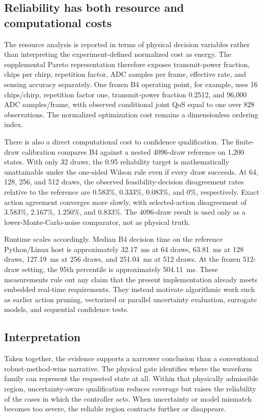 \subsection{Reliability has both resource and computational costs}

The resource analysis is reported in terms of physical decision variables rather than interpreting the experiment-defined normalized cost as energy. The supplemental Pareto representation therefore exposes transmit-power fraction, chips per chirp, repetition factor, ADC samples per frame, effective rate, and sensing accuracy separately. One frozen B4 operating point, for example, uses 16 chips/chirp, repetition factor one, transmit-power fraction 0.2512, and 96,000 ADC samples/frame, with observed conditional joint QoS equal to one over 828 observations. The normalized optimization cost remains a dimensionless ordering index.

There is also a direct computational cost to confidence qualification. The finite-draw calibration compares B4 against a nested 4096-draw reference on 1,200 states. With only 32 draws, the 0.95 reliability target is mathematically unattainable under the one-sided Wilson rule even if every draw succeeds. At 64, 128, 256, and 512 draws, the observed feasibility-decision disagreement rates relative to the reference are 0.583\%, 0.333\%, 0.083\%, and 0\%, respectively. Exact action agreement converges more slowly, with selected-action disagreement of 3.583\%, 2.167\%, 1.250\%, and 0.833\%. The 4096-draw result is used only as a lower-Monte-Carlo-noise comparator, not as physical truth.

Runtime scales accordingly. Median B4 decision time on the reference Python/Linux host is approximately 32.17~ms at 64 draws, 63.81~ms at 128 draws, 127.19~ms at 256 draws, and 251.04~ms at 512 draws. At the frozen 512-draw setting, the 95th percentile is approximately 504.11~ms. These measurements rule out any claim that the present implementation already meets embedded real-time requirements. They instead motivate algorithmic work such as earlier action pruning, vectorized or parallel uncertainty evaluation, surrogate models, and sequential confidence tests.

\subsection{Interpretation}

Taken together, the evidence supports a narrower conclusion than a conventional robust-method-wins narrative. The physical gate identifies where the waveform family can represent the requested state at all. Within that physically admissible region, uncertainty-aware qualification reduces coverage but raises the reliability of the cases in which the controller acts. When uncertainty or model mismatch becomes too severe, the reliable region contracts further or disappears.

